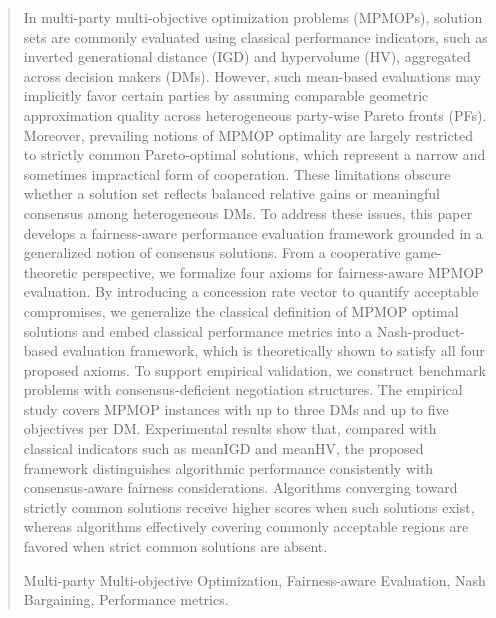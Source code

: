 \documentclass[journal]{IEEEtran}
\begin{document}
\begin{abstract}
	In multi-party multi-objective optimization problems (MPMOPs), solution sets are commonly evaluated using classical performance indicators, such as inverted generational distance (IGD) and hypervolume (HV), aggregated across decision makers (DMs). However, such mean-based evaluations may implicitly favor certain parties by assuming comparable geometric approximation quality across heterogeneous party-wise Pareto fronts (PFs). Moreover, prevailing notions of MPMOP optimality are largely restricted to strictly common Pareto-optimal solutions, which represent a narrow and sometimes impractical form of cooperation. These limitations obscure whether a solution set reflects balanced relative gains or meaningful consensus among heterogeneous DMs. To address these issues, this paper develops a fairness-aware performance evaluation framework grounded in a generalized notion of consensus solutions. From a cooperative game-theoretic perspective, we formalize four axioms for fairness-aware MPMOP evaluation. By introducing a concession rate vector to quantify acceptable compromises, we generalize the classical definition of MPMOP optimal solutions and embed classical performance metrics into a Nash-product-based evaluation framework, which is theoretically shown to satisfy all four proposed axioms. To support empirical validation, we construct benchmark problems with consensus-deficient negotiation structures. The empirical study covers MPMOP instances with up to three DMs and up to five objectives per DM. Experimental results show that, compared with classical indicators such as meanIGD and meanHV, the proposed framework distinguishes algorithmic performance consistently with consensus-aware fairness considerations. Algorithms converging toward strictly common solutions receive higher scores when such solutions exist, whereas algorithms effectively covering commonly acceptable regions are favored when strict common solutions are absent.

\begin{IEEEkeywords}
Multi-party Multi-objective Optimization, Fairness-aware Evaluation, Nash Bargaining, Performance metrics.
\end{IEEEkeywords}
\end{abstract}

\IEEEpeerreviewmaketitle
\end{document}

